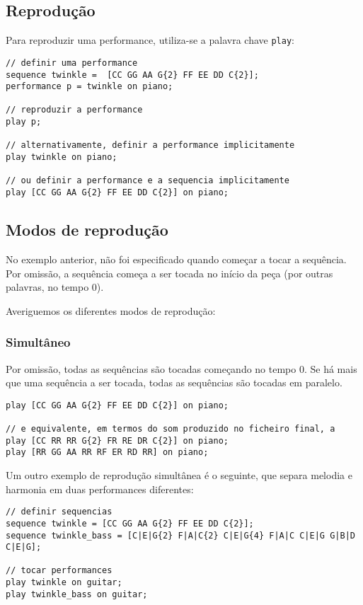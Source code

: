 \documentclass{article}
\begin{document}
\subsection{Reprodução}
Para reproduzir uma performance, utiliza-se a palavra chave \texttt{play}:
\begin{lstlisting} 
// definir uma performance
sequence twinkle =  [CC GG AA G{2} FF EE DD C{2}];
performance p = twinkle on piano;

// reproduzir a performance
play p;

// alternativamente, definir a performance implicitamente
play twinkle on piano;

// ou definir a performance e a sequencia implicitamente
play [CC GG AA G{2} FF EE DD C{2}] on piano;
\end{lstlisting} 
\subsection{Modos de reprodução}
No exemplo anterior, não foi especificado quando começar a tocar a sequência. Por omissão, a sequência começa a ser tocada no início da peça (por outras palavras, no tempo 0).

Averiguemos os diferentes modos de reprodução:

\subsubsection{Simultâneo}
Por omissão, todas as sequências são tocadas começando no tempo 0. Se há mais que uma sequência a ser tocada, todas as sequências são tocadas em paralelo.

\begin{lstlisting} 
play [CC GG AA G{2} FF EE DD C{2}] on piano;

// e equivalente, em termos do som produzido no ficheiro final, a
play [CC RR RR G{2} FR RE DR C{2}] on piano;
play [RR GG AA RR RF ER RD RR] on piano;
\end{lstlisting}

Um outro exemplo de reprodução simultânea é o seguinte, que separa melodia e harmonia em duas performances diferentes:
\begin{lstlisting} 
// definir sequencias
sequence twinkle = [CC GG AA G{2} FF EE DD C{2}];
sequence twinkle_bass = [C|E|G{2} F|A|C{2} C|E|G{4} F|A|C C|E|G G|B|D C|E|G];

// tocar performances
play twinkle on guitar;
play twinkle_bass on guitar;
\end{lstlisting}
\end{document}
